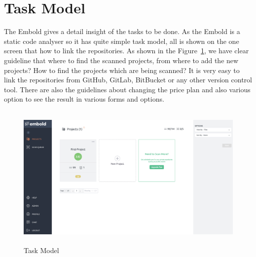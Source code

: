 \section{Task Model}
The Embold gives a detail insight of the tasks to be done. As the Embold is a static code analyser so it has quite simple task model, all is shown on the one screen that how to link the repositories. As shown in the Figure~\ref{fig:Task},  we have clear guideline that where to find the scanned projects, from where to add the new projects? How to find the projects which are being scanned? It is very easy to link the repositories from GitHub, GitLab, BitBucket or any other version control tool. There are also the guidelines about changing the price plan and also various option to see the result in various forms and options.
\begin{figure}[htbp]
\begin{center}
\includegraphics[width=6.5in, height=2.8in]{task-model.png}
\caption{Task Model ~\cite{emboldio}}
\label{fig:Task}
\end{center}
\end{figure}


